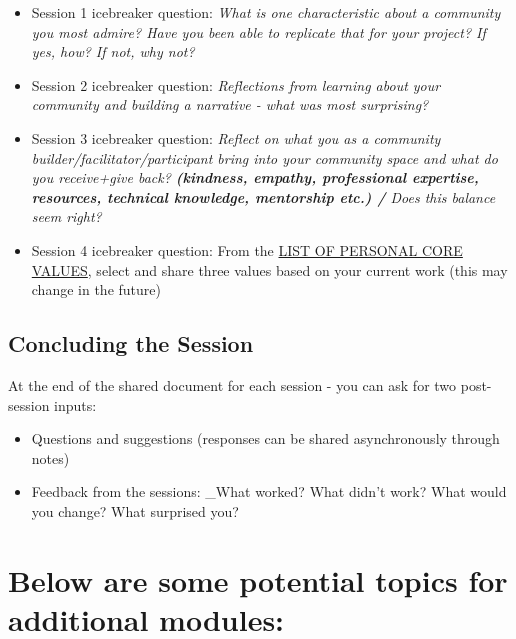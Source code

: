\documentclass[
  letterpaper,
  DIV=11,
  numbers=noendperiod]{scrreport}
\providecommand{\tightlist}{%
  \setlength{\itemsep}{0pt}\setlength{\parskip}{0pt}}\usepackage{longtable,booktabs,array}
\begin{document}
\begin{itemize}
\tightlist
\item
  Session 1 icebreaker question: \emph{What is one characteristic about
  a community you most admire? Have you been able to replicate that for
  your project? If yes, how? If not, why not?}
\item
  Session 2 icebreaker question: \emph{Reflections from learning about
  your community and building a narrative - what was most surprising?}
\item
  Session 3 icebreaker question: \emph{Reflect on what you as a
  community builder/facilitator/participant bring into your community
  space and what do you receive+give back?\textbf{ (kindness, empathy,
  professional expertise, resources, technical knowledge, mentorship
  etc.) / }Does this balance seem right?}
\item
  Session 4 icebreaker question: From the
  \href{https://thehappinessplanner.co.uk/pages/list-of-core-values}{LIST
  OF PERSONAL CORE VALUES}, select and share three values based on your
  current work (this may change in the future)
\end{itemize}

\hypertarget{concluding-the-session}{%
\subsection{Concluding the Session}\label{concluding-the-session}}

At the end of the shared document for each session - you can ask for two
post-session inputs:

\begin{itemize}
\tightlist
\item
  Questions and suggestions (responses can be shared asynchronously
  through notes)
\item
  Feedback from the sessions: \_What worked? What didn't work? What
  would you change? What surprised you?
\end{itemize}

\hypertarget{below-are-some-potential-topics-for-additional-modules}{%
\section{Below are some potential topics for additional
modules:}\label{below-are-some-potential-topics-for-additional-modules}}
\end{document}
